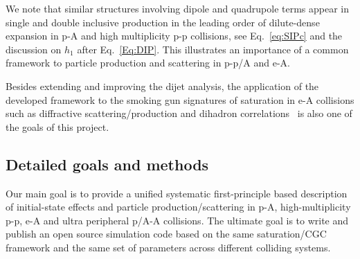 We note that similar structures involving dipole and quadrupole 
terms appear in single and double inclusive production in the leading order of dilute-dense expansion in 
p-A and high multiplicity p-p collisions, see Eq.~\eqref{eq:SIPc} and the discussion on $h_1$ after 
Eq.~\eqref{Eq:DIP}. This illustrates an importance of a common framework to
particle production and scattering in 
p-p/A and e-A. 


Besides 
 extending and improving the dijet analysis, the application of the 
 developed framework to the smoking gun signatures of saturation in e-A collisions such as diffractive scattering/production
and dihadron correlations~\cite{Aschenauer:2017jsk} is also one of the goals of this project. 



\vspace{0.5em}
    \subsection{Detailed goals and methods}
        \label{sec:p11}

		Our main goal is to provide a unified systematic first-principle based description of
		initial-state effects and particle production/scattering in p-A, 
		high-multiplicity p-p, e-A and ultra peripheral p/A-A collisions.  
		The ultimate goal is to write and publish an open source  simulation code based on the same saturation/CGC framework and 
		the same set of parameters across different colliding systems. 

